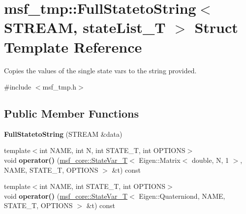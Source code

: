 \hypertarget{structmsf__tmp_1_1FullStatetoString}{\section{msf\-\_\-tmp\-:\-:Full\-Stateto\-String$<$ S\-T\-R\-E\-A\-M, state\-List\-\_\-\-T $>$ Struct Template Reference}
\label{structmsf__tmp_1_1FullStatetoString}
}


Copies the values of the single state vars to the string provided.  




{\ttfamily \#include $<$msf\-\_\-tmp.\-h$>$}

\subsection*{Public Member Functions}
\begin{DoxyCompactItemize}
\item 
\hypertarget{structmsf__tmp_1_1FullStatetoString_a01b581b8a93e7de256d487d609f9f1ca}{{\bfseries Full\-Stateto\-String} (S\-T\-R\-E\-A\-M \&data)}\label{structmsf__tmp_1_1FullStatetoString_a01b581b8a93e7de256d487d609f9f1ca}

\item 
\hypertarget{structmsf__tmp_1_1FullStatetoString_a8ab4cd670bb8d0a94040ca09bad2a28d}{{\footnotesize template$<$int N\-A\-M\-E, int N, int S\-T\-A\-T\-E\-\_\-\-T, int O\-P\-T\-I\-O\-N\-S$>$ }\\void {\bfseries operator()} (\hyperlink{structmsf__core_1_1StateVar__T}{msf\-\_\-core\-::\-State\-Var\-\_\-\-T}$<$ Eigen\-::\-Matrix$<$ double, N, 1 $>$, N\-A\-M\-E, S\-T\-A\-T\-E\-\_\-\-T, O\-P\-T\-I\-O\-N\-S $>$ \&t) const }\label{structmsf__tmp_1_1FullStatetoString_a8ab4cd670bb8d0a94040ca09bad2a28d}

\item 
\hypertarget{structmsf__tmp_1_1FullStatetoString_af63628ec73c77813ebc5abfd30add10e}{{\footnotesize template$<$int N\-A\-M\-E, int S\-T\-A\-T\-E\-\_\-\-T, int O\-P\-T\-I\-O\-N\-S$>$ }\\void {\bfseries operator()} (\hyperlink{structmsf__core_1_1StateVar__T}{msf\-\_\-core\-::\-State\-Var\-\_\-\-T}$<$ Eigen\-::\-Quaterniond, N\-A\-M\-E, S\-T\-A\-T\-E\-\_\-\-T, O\-P\-T\-I\-O\-N\-S $>$ \&t) const }\label{structmsf__tmp_1_1FullStatetoString_af63628ec73c77813ebc5abfd30add10e}

\end{DoxyCompactItemize}


